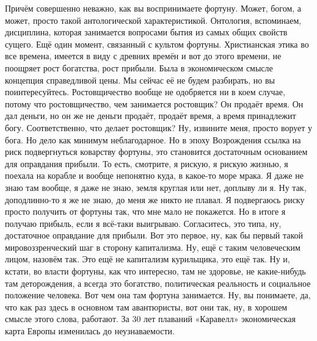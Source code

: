 Причём совершенно неважно, как вы воспринимаете фортуну. Может, богом, а может,
просто такой антологической характеристикой. Онтология, вспоминаем, дисциплина,
которая занимается вопросами бытия из самых общих свойств сущего. Ещё один
момент, связанный с культом фортуны. Христианская этика во все времена, имеется
в виду с древних времён и вот до этого времени, не поощряет рост богатства, рост
прибыли. Была в экономическом смысле концепция справедливой цены. Мы сейчас её
не будем разбирать, но вы поинтересуйтесь. Ростовщичество вообще не одобряется
ни в коем случае, потому что ростовщичество, чем занимается ростовщик? Он
продаёт время. Он дал деньги, но он же не деньги продаёт, продаёт время, а время
принадлежит богу. Соответственно, что делает ростовщик? Ну, извините меня,
просто ворует у бога. Но дело как минимум неблагодарное. Но в эпоху Возрождения
ссылка на риск подвергнуться коварству фортуны, это становится достаточным
основанием для оправдания прибыли. То есть, смотрите, я рискую, я рискую жизнью,
я поехала на корабле и вообще непонятно куда, в какое-то море мрака. Я даже не
знаю там вообще, я даже не знаю, земля круглая или нет, доплыву ли я. Ну так,
доподлинно-то я же не знаю, до меня же никто не плавал. Я подвергаюсь риску
просто получить от фортуны так, что мне мало не покажется. Но в итоге я получаю
прибыль, если я всё-таки выигрываю. Согласитесь, это типа, ну, достаточное
оправдание для прибыли. Вот это первое, ну, как бы первый такой
мировоззренческий шаг в сторону капитализма. Ну, ещё с таким человеческим лицом,
назовём так. Это ещё не капитализм курильщика, это ещё так. Ну и, кстати, во
власти фортуны, как что интересно, там не здоровье, не какие-нибудь там
деторождения, а всегда это богатство, политическая реальность и социальное
положение человека. Вот чем она там фортуна занимается. Ну, вы понимаете, да,
что как раз здесь в основном там авантюристы, вот они так, ну, в хорошем смысле
этого слова, работают. За 30 лет плаваний «Каравелл» экономическая карта Европы
изменилась до неузнаваемости. 

